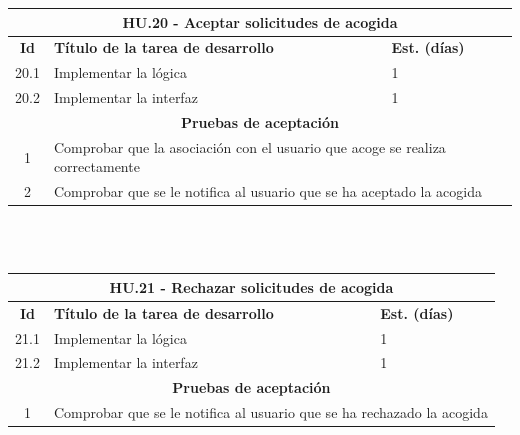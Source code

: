 \begin{tabular}{|c|p{9.5cm}|p{1cm}|}
	\hline
	\multicolumn{3}{|c|}{\textbf{HU.20 - Aceptar solicitudes de acogida}} \\
	\hline
	\textbf{Id} & \textbf{Título de la tarea de desarrollo} & \textbf{Est. (días)} \\
	\hline
	20.1 &  Implementar la lógica & 1 \\ \hline
	20.2 &  Implementar la interfaz & 1 \\ \hline
	\multicolumn{3}{|c|}{\textbf{Pruebas de aceptación}} \\ \hline
	1 & \multicolumn{2}{|p{12cm}|}{Comprobar que la asociación con el usuario que acoge se realiza correctamente} \\ \hline
	2 & \multicolumn{2}{|p{12cm}|}{Comprobar que se le notifica al usuario que se ha aceptado la acogida} \\ \hline
	
	
\end{tabular} \\ \\


\begin{tabular}{|c|p{9.5cm}|p{1cm}|}
	\hline
	\multicolumn{3}{|c|}{\textbf{HU.21 - Rechazar solicitudes de acogida}} \\
	\hline
	\textbf{Id} & \textbf{Título de la tarea de desarrollo} & \textbf{Est. (días)} \\
	\hline
	21.1 &  Implementar la lógica & 1 \\ \hline
	21.2 &  Implementar la interfaz & 1 \\ \hline
	\multicolumn{3}{|c|}{\textbf{Pruebas de aceptación}} \\ \hline
	1 & \multicolumn{2}{|p{12cm}|}{Comprobar que se le notifica al usuario que se ha rechazado la acogida} \\ \hline
	
\end{tabular} \\ \\

